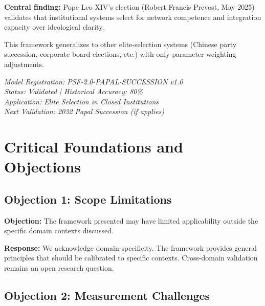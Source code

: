 \textbf{Central finding:} Pope Leo XIV's election (Robert Francis Prevost, May 2025) validates that institutional systems select for network competence and integration capacity over ideological clarity.

This framework generalizes to other elite-selection systems (Chinese party succession, corporate board elections, etc.) with only parameter weighting adjustments.

\vspace{2cm}

\begin{center}
\textit{Model Registration: PSF-2.0-PAPAL-SUCCESSION v1.0} \\
\textit{Status: Validated | Historical Accuracy: 80\%} \\
\textit{Application: Elite Selection in Closed Institutions} \\
\textit{Next Validation: 2032 Papal Succession (if applies)}
\end{center}


\nocite{bcm_master}



\section{Critical Foundations and Objections}
\label{sec:pap3-foundations}

\subsection{Objection 1: Scope Limitations}

\textbf{Objection:} The framework presented may have limited applicability
outside the specific domain contexts discussed.

\textbf{Response:} We acknowledge domain-specificity. The framework provides
general principles that should be calibrated to specific contexts. Cross-domain
validation remains an open research question.

\subsection{Objection 2: Measurement Challenges}

